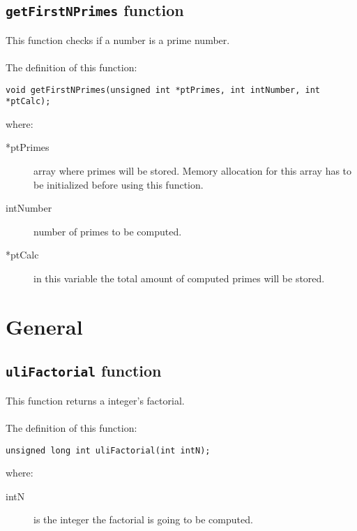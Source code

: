 \subsection{\texttt{getFirstNPrimes} function}

This function checks if a number is a prime number.\\ \\
%
The definition of this function:
%
\begin{verbatim}
void getFirstNPrimes(unsigned int *ptPrimes, int intNumber, int *ptCalc);
\end{verbatim}
%
where:
%
\begin{description}
\item[*ptPrimes] array where primes will be stored. Memory allocation for this array has to be initialized before using this function.
\item[intNumber] number of primes to be computed.
\item[*ptCalc] in this variable the total amount of computed primes will be stored.
\end{description}

\section{General}

\subsection{\texttt{uliFactorial} function}

This function returns a integer's factorial.\\ \\
%
The definition of this function:
%
\begin{verbatim}
unsigned long int uliFactorial(int intN);
\end{verbatim}
%
where:
%
\begin{description}
\item[intN] is the integer the factorial is going to be computed.
\end{description}
%
